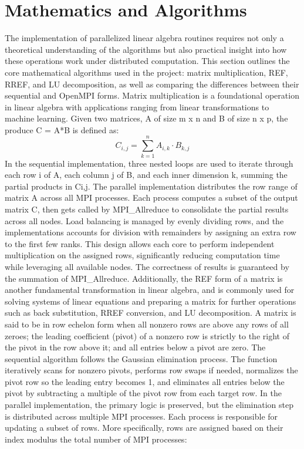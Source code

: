 \documentclass[12pt]{article}
\begin{document}
\section{Mathematics and Algorithms}
The implementation of parallelized linear algebra routines requires not only a theoretical understanding of the algorithms but also practical insight into how these operations work under distributed computation. This section outlines the core mathematical algorithms used in the project: matrix multiplication, REF, RREF, and LU decomposition, as well as comparing the differences between their sequential and OpenMPI forms.
Matrix multiplication is a foundational operation in linear algebra with applications ranging from linear transformations to machine learning. Given two matrices, A of size m x n and B of size n x p, the produce C = A*B is defined as:
\[
    C_{i,j} = \sum_{k=1}^{n} A_{i,k} \cdot B_{k,j}
\]
In the sequential implementation, three nested loops are used to iterate through each row i of A, each column j of B, and each inner dimension k, summing the partial products in Ci,j. The parallel implementation distributes the row range of matrix A across all MPI processes. Each process computes a subset of the output matrix C, then gets called by MPI_Allreduce to consolidate the partial results across all nodes. Load balancing is managed by evenly dividing rows, and the implementations accounts for division with remainders by assigning an extra row to the first few ranks. This design allows each core to perform independent multiplication on the assigned rows, significantly reducing computation time while leveraging all available nodes. The correctness of results is guaranteed by the summation of MPI_Allreduce.
Additionally, the REF form of a matrix is another fundamental transformation in linear algebra, and is commonly used for solving systems of linear equations and preparing a matrix for further operations such as back substitution, RREF conversion, and LU decomposition. A matrix is said to be in row echelon form when all nonzero rows are above any rows of all zeroes; the leading coefficient (pivot) of a nonzero row is strictly to the right of the pivot in the row above it; and all entries below a pivot are zero. The sequential algorithm follows the Gaussian elimination process. The function iteratively scans for nonzero pivots, performs row swaps if needed, normalizes the pivot row so the leading entry becomes 1, and eliminates all entries below the pivot by subtracting a multiple of the pivot row from each target row. In the parallel implementation, the primary logic is preserved, but the elimination step is distributed across multiple MPI processes. Each process is responsible for updating a subset of rows. More specifically, rows are assigned based on their index modulus the total number of MPI processes:
\end{document}
